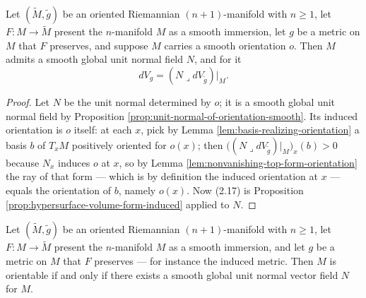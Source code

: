 \begin{proposition}
\label{prop:hypersurface-volume-form-only-if}
\leanok
{}
Let $(\tilde M, \tilde g)$ be an oriented Riemannian $(n+1)$-manifold with $n \geq 1$, let
$F : M \to \tilde M$ present the $n$-manifold $M$ as a smooth immersion, let $g$ be a metric on
$M$ that $F$ preserves, and suppose $M$ carries a smooth orientation $o$. Then $M$ admits a
smooth global unit normal field $N$, and for it
\[
  dV_g = (N \lrcorner dV_{\tilde{g}})|_M. \tag{2.17}
\]
\end{proposition}

\begin{proof}
\leanok
{}
Let $N$ be the unit normal determined by $o$; it is a smooth global unit normal field by
Proposition \ref{prop:unit-normal-of-orientation-smooth}. Its induced orientation is $o$ itself:
at each $x$, pick by Lemma \ref{lem:basis-realizing-orientation} a basis $b$ of $T_x M$ positively
oriented for $o(x)$; then $\bigl((N \lrcorner dV_{\tilde g})|_M\bigr)_x(b) > 0$ because $N_x$
induces $o$ at $x$, so by Lemma \ref{lem:nonvanishing-top-form-orientation} the ray of that form
— which is by definition the induced orientation at $x$ — equals the orientation of $b$, namely
$o(x)$. Now (2.17) is Proposition \ref{prop:hypersurface-volume-form-induced} applied to $N$.
\end{proof}

\begin{proposition}
\label{prop:hypersurface-volume-form}
\leanok
{}
Let $(\tilde M, \tilde g)$ be an oriented Riemannian $(n+1)$-manifold with $n \geq 1$, let
$F : M \to \tilde M$ present the $n$-manifold $M$ as a smooth immersion, and let $g$ be a metric
on $M$ that $F$ preserves — for instance the induced metric. Then $M$ is orientable if and only
if there exists a smooth global unit normal vector field $N$ for $M$.
\end{proposition}

